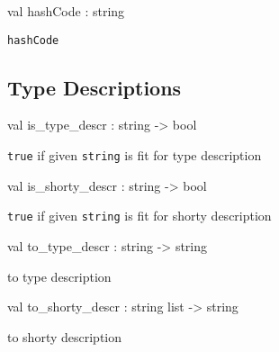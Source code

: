 \documentclass[11pt]{article}
\begin{document}
\label{val:Java.hashCode}\begin{ocamldoccode}
val hashCode : string
\end{ocamldoccode}
\begin{ocamldocdescription}
{\tt{hashCode}}


\end{ocamldocdescription}




\subsection{Type Descriptions}




\label{val:Java.is-underscoretype-underscoredescr}\begin{ocamldoccode}
val is_type_descr : string -> bool
\end{ocamldoccode}
\begin{ocamldocdescription}
{\tt{true}} if given {\tt{string}} is fit for type description


\end{ocamldocdescription}




\label{val:Java.is-underscoreshorty-underscoredescr}\begin{ocamldoccode}
val is_shorty_descr : string -> bool
\end{ocamldoccode}
\begin{ocamldocdescription}
{\tt{true}} if given {\tt{string}} is fit for shorty description


\end{ocamldocdescription}




\label{val:Java.to-underscoretype-underscoredescr}\begin{ocamldoccode}
val to_type_descr : string -> string
\end{ocamldoccode}
\begin{ocamldocdescription}
to type description


\end{ocamldocdescription}




\label{val:Java.to-underscoreshorty-underscoredescr}\begin{ocamldoccode}
val to_shorty_descr : string list -> string
\end{ocamldoccode}
\begin{ocamldocdescription}
to shorty description


\end{ocamldocdescription}
\end{document}
